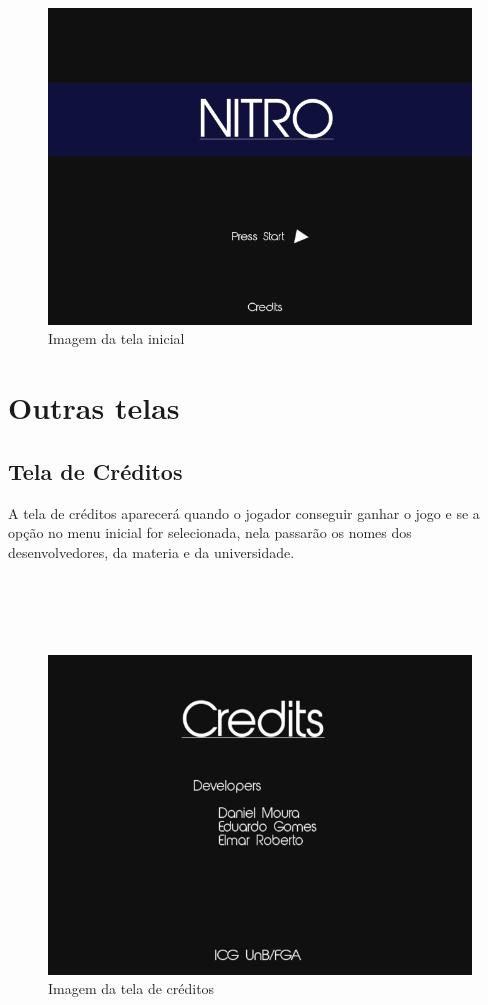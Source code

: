 \label{1}
\begin{figure}[!h]
	\centering
		\includegraphics[scale=0.3]{figuras/tela_inicial}
	\caption{Imagem da tela inicial}
\end{figure}

\section{Outras telas}

\subsection{Tela de Créditos}

A tela de créditos aparecerá quando o jogador conseguir ganhar o jogo e se a opção no menu inicial for selecionada, nela passarão os nomes dos desenvolvedores, da materia e da universidade. \\\\\\\\\\

\begin{figure}[!h]
	\centering
		\includegraphics[scale=0.3]{figuras/creditos}
	\caption{Imagem da tela de créditos}
\end{figure}

